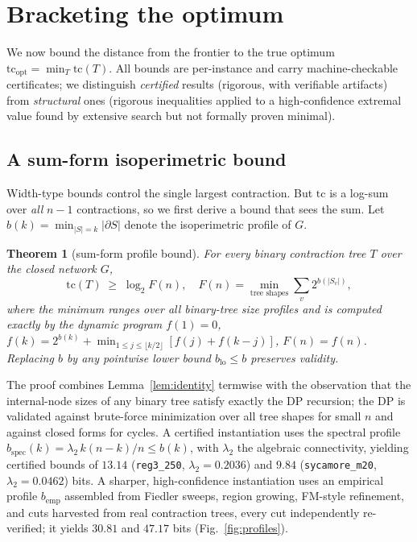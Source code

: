 \documentclass[a4paper,11pt,noarxiv]{quantumarticle}
\newtheorem{theorem}{Theorem}
\newcommand{\tc}{\mathrm{tc}}
\newcommand{\bnd}[1]{\partial #1}
\begin{document}
\section{Bracketing the optimum}
\label{sec:bounds}

We now bound the distance from the frontier to the true optimum
$\tc_{\mathrm{opt}} = \min_T \tc(T)$. All bounds are per-instance and carry
machine-checkable certificates; we distinguish \emph{certified} results
(rigorous, with verifiable artifacts) from \emph{structural} ones
(rigorous inequalities applied to a high-confidence extremal value found by
extensive search but not formally proven minimal).

\subsection{A sum-form isoperimetric bound}

Width-type bounds control the single largest contraction. But $\tc$ is a
log-sum over \emph{all} $n-1$ contractions, so we first derive a bound that
sees the sum. Let $b(k) = \min_{|S|=k} |\bnd{S}|$ denote the isoperimetric
profile of $G$.

\begin{theorem}[sum-form profile bound]
\label{thm:sumform}
For every binary contraction tree $T$ over the closed network $G$,
\begin{equation}
\tc(T) \;\ge\; \log_2 F(n),
\quad
F(n) = \min_{\text{tree shapes}} \sum_v 2^{b(|S_v|)},
\end{equation}
where the minimum ranges over all binary-tree size profiles and is computed
exactly by the dynamic program
$f(1)=0$, $f(k) = 2^{b(k)} + \min_{1\le j\le \lfloor k/2\rfloor}
[f(j)+f(k-j)]$, $F(n)=f(n)$. Replacing $b$ by any pointwise lower bound
$b_{\mathrm{lo}} \le b$ preserves validity.
\end{theorem}

The proof combines Lemma~\ref{lem:identity} termwise with the observation
that the internal-node sizes of any binary tree satisfy exactly the DP
recursion; the DP is validated against brute-force minimization over all tree
shapes for small $n$ and against closed forms for cycles. A certified
instantiation uses the spectral profile
$b_{\mathrm{spec}}(k) = \lambda_2\, k(n-k)/n \le b(k)$, with $\lambda_2$ the
algebraic connectivity, yielding certified bounds of $13.14$
(\texttt{reg3\_250}, $\lambda_2 = 0.2036$) and $9.84$
(\texttt{sycamore\_m20}, $\lambda_2 = 0.0462$) bits. A sharper,
high-confidence instantiation uses an empirical profile $b_{\mathrm{emp}}$
assembled from Fiedler sweeps, region growing, FM-style refinement, and cuts
harvested from real contraction trees, every cut independently re-verified;
it yields $30.81$ and $47.17$ bits (Fig.~\ref{fig:profiles}).
\end{document}

